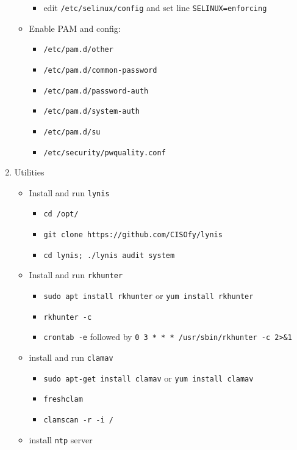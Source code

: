 \documentclass[12pt, letterpaper,oneocolumn]{article}
\begin{document}
\begin{appendices}
\begin{enumerate}
\begin{itemize}
    \begin{itemize}
    \item
      edit \texttt{/etc/selinux/config} and set line
      \texttt{SELINUX=enforcing}
    \end{itemize}
  \item
    Enable PAM and config:

    \begin{itemize}
    \item
      \texttt{/etc/pam.d/other}
    \item
      \texttt{/etc/pam.d/common-password}
    \item
      \texttt{/etc/pam.d/password-auth}
    \item
      \texttt{/etc/pam.d/system-auth}
    \item
      \texttt{/etc/pam.d/su}
    \item
      \texttt{/etc/security/pwquality.conf}
    \end{itemize}
  \end{itemize}

\item
  Utilities

  \begin{itemize}
  \item
    Install and run \texttt{lynis}

    \begin{itemize}
    \item
      \texttt{cd\ /opt/}
    \item
      \texttt{git\ clone\ https://github.com/CISOfy/lynis}
    \item
      \texttt{cd\ lynis;\ ./lynis\ audit\ system}
    \end{itemize}
  \item
    Install and run \texttt{rkhunter}

    \begin{itemize}
    \item
      \texttt{sudo\ apt\ install\ rkhunter} or
      \texttt{yum\ install\ rkhunter}
    \item
      \texttt{rkhunter\ -c}
    \item
      \texttt{crontab\ -e} followed by
      \texttt{0\ 3\ *\ *\ *\ /usr/sbin/rkhunter\ -c\ 2\textgreater{}\&1}
    \end{itemize}
  \item
    install and run \texttt{clamav}

    \begin{itemize}
    \item
      \texttt{sudo\ apt-get\ install\ clamav} or
      \texttt{yum\ install\ clamav}
    \item
      \texttt{freshclam}
    \item
      \texttt{clamscan\ -r\ -i\ /}
    \end{itemize}
  \item
    install \texttt{ntp} server


\end{itemize}
\end{enumerate}
\end{appendices}
\end{document}
